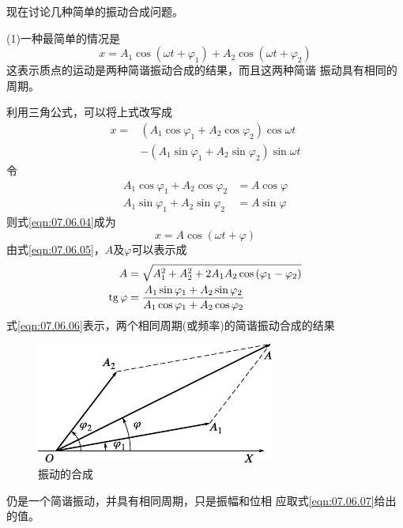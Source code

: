 现在讨论几种简单的振动合成问题。

(1)一种最简单的情况是
\begin{equation}\label{eqn:07.06.03}
  x = A _ { 1 } \cos \left( \omega t + \varphi _ { 1 } \right) + A _ { 2 } \cos \left( \omega t + \varphi _ { 2 } \right)
\end{equation}
这表示质点的运动是两种简谐振动合成的结果，而且这两种简谐
振动具有相同的周期。

利用三角公式，可以将上式改写成
\begin{equation}\label{eqn:07.06.04}
  \begin{aligned}
    x = & \left( A _ { 1 } \cos \varphi _ { 1 } + A _ { 2 } \cos \varphi _ { 2 } \right) \cos \omega t   \\
        & - \left( A _ { 1 } \sin \varphi _ { 1 } + A _ { 2 } \sin \varphi _ { 2 } \right) \sin \omega t
  \end{aligned}
\end{equation}
令
\begin{equation}\label{eqn:07.06.05}
  \begin{aligned}
    A _ { 1 } \cos \varphi _ { 1 } + A _ { 2 } \cos \varphi _ { 2 }  & = A  \cos \varphi \\
    A _ { 1 } \sin \varphi _ { 1 } + A _ { 2 }  \sin \varphi _ { 2 } & = A  \sin \varphi
  \end{aligned}
\end{equation}
则式\eqref{eqn:07.06.04}成为
\begin{equation}\label{eqn:07.06.06}
  x = A  \cos \left( \omega t +  \varphi \right)
\end{equation}
由式\ref{eqn:07.06.05}，$ A $及$ \varphi $可以表示成
\begin{equation}\label{eqn:07.06.07}
  \begin{split}
    A &= \sqrt { A _ { 1 } ^ { 2 } + A _ 2 ^ { 2 } + 2 A _ { 1 } A _ { 2 }  \cos \left( \varphi _ { 1 } -  \varphi _ { 2 } \right) } \\
    \operatorname{tg} \varphi &= \frac { A _ { 1 }  \sin \varphi _ { 1 } + A _ { 2 } \sin \varphi _ { 2 } } { A _ { 1 }  \cos \varphi _ { 1 } + A _ { 2 } \cos \varphi _ { 2 } }
  \end{split}
\end{equation}
式\eqref{eqn:07.06.06}表示，两个相同周期(或频率)的简谐振动合成的结果
\begin{figure}
  \vspace{-1em}
  \centering
  \includegraphics{figure/fig07.11}
  \caption{振动的合成}
  \label{fig:07.11}
\end{figure}
仍是一个简谐振动，并具有相同周期，只是振幅和位相
应取式\eqref{eqn:07.06.07}给出的值。

